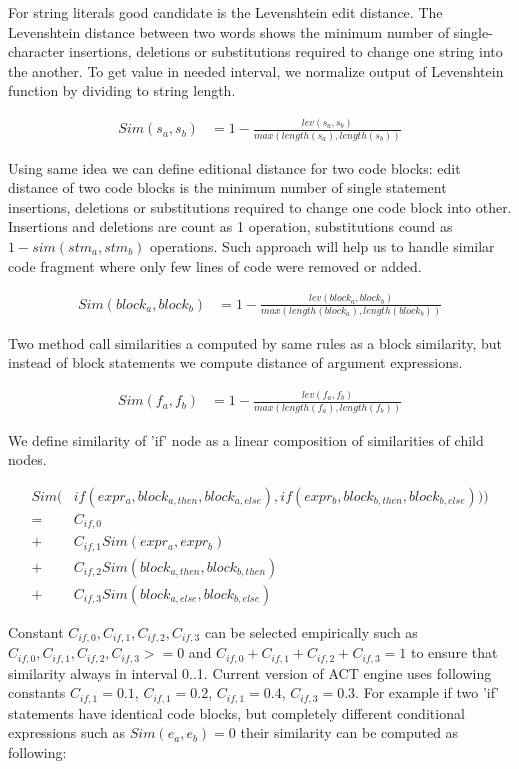 For string literals good candidate is the Levenshtein edit distance\cite{surveys/navarro01}.
The Levenshtein distance between two words shows the minimum number of single-character insertions, deletions or substitutions required to change one string into the another.
To get value in needed interval, we normalize output of Levenshtein function by dividing to string length.

\begin{align*}
Sim(s_a, s_b) &= 1 - \frac{lev(s_a,s_b)}{max(length(s_a), length(s_b))}
\end{align*}

Using same idea we can define editional distance for two code blocks: edit distance of two code blocks is the minimum
number of single statement insertions, deletions or substitutions required to change one code block into other.
Insertions and deletions are count as 1 operation, substitutions cound as $1 - sim(stm_a, stm_b)$ operations.
Such approach will help us to handle similar code fragment where only few lines of code were removed or added.

\begin{align*}
	Sim(block_a, block_b) &= 1 - \frac{lev(block_a,block_b)}{max(length(block_a), length(block_b))}
\end{align*}

Two method call similarities a computed by same rules as a block similarity, but instead of block statements we compute
distance of argument expressions.

\begin{align*}
	Sim(f_a, f_b) &= 1 - \frac{lev(f_a,f_b)}{max(length(f_a), length(f_b))}
\end{align*}

We define similarity of 'if' node as a linear composition of similarities of child nodes. 

\begin{align*}
	Sim(&if(expr_a, block_{a,then}, block_{a,else}), if(expr_b, block_{b,then}, block_{b,else})))\\
	=& C_{if,0} \\
	+& C_{if,1} Sim(expr_a, expr_b) \\
	+& C_{if,2} Sim(block_{a,then}, block_{b,then}) \\
	+& C_{if,3} Sim(block_{a,else}, block_{b,else})
\end{align*}

Constant $C_{if,0}, C_{if,1}, C_{if,2}, C_{if,3}$ can be selected empirically such as $C_{if,0}, C_{if,1}, C_{if,2},
C_{if,3} >= 0$ and $C_{if,0} + C_{if,1} + C_{if,2} + C_{if,3} = 1$ to ensure that similarity always in interval 0..1.
Current version of ACT engine uses following constants $C_{if,1} = 0.1$, $C_{if,1} = 0.2$, $C_{if,1} = 0.4$, $C_{if,3} = 0.3$.
For example if two 'if' statements have identical code blocks, but completely different conditional expressions such as $Sim(e_a,e_b) = 0$ their
similarity can be computed as following:

